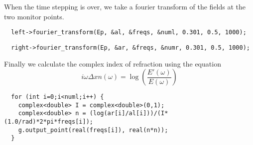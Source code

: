 \begin{comment}
    f.step();
  }
  grace g("eps", dirname);
  complex<double> *al, *ar, *freqs;
  int numl, numr;
  printf("Working on left fourier transform...\n");
\end{comment}
When the time stepping is over, we take a fourier transform of the fields
at the two monitor points.
\begin{verbatim}
  left->fourier_transform(Ep, &al, &freqs, &numl, 0.301, 0.5, 1000);
\end{verbatim}
\begin{comment}
  delete[] freqs;
  printf("Working on right fourier transform...\n");
\end{comment}
\begin{verbatim}
  right->fourier_transform(Ep, &ar, &freqs, &numr, 0.301, 0.5, 1000);
\end{verbatim}
\begin{comment}
  if (numl != numr) printf("Aaack you need both nums to be the same!\n");
  g.new_set();
  g.set_legend("\\x\\e\\s2\\N");
\end{comment}
Finally we calculate the complex index of refraction using the equation
\begin{equation*}
i \omega \Delta x n(\omega) = \log \left(\frac{E'(\omega)}{E(\omega)}\right)
\end{equation*}
\begin{verbatim}
  for (int i=0;i<numl;i++) {
    complex<double> I = complex<double>(0,1);
    complex<double> n = (log(ar[i]/al[i]))/(I*(1.0/rad)*2*pi*freqs[i]);
    g.output_point(real(freqs[i]), real(n*n));
  }
\end{verbatim}
\begin{comment}
  g.new_set();
  g.set_legend("\\x\\e\\s2\\N");
  for (int i=0;i<numl;i++) {
    complex<double> I = complex<double>(0,1);
    complex<double> n = (log(ar[i]/al[i]))/(I*(1.0/rad)*2*pi*freqs[i]);
    g.output_point(real(freqs[i]), imag(n*n));
  }
}
\end{comment}

